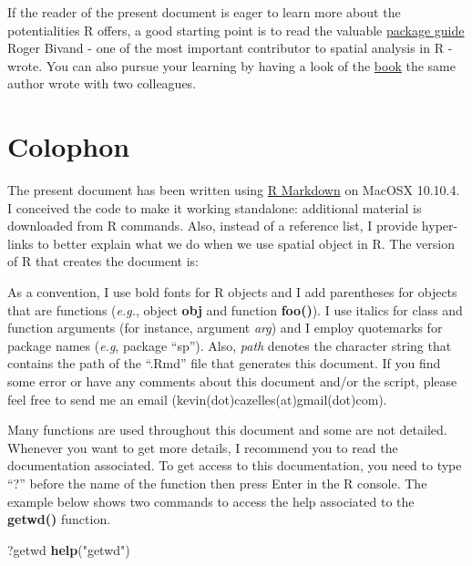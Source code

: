 \documentclass[]{report}
\newenvironment{Shaded}{\begin{snugshade}}{\end{snugshade}}
\newcommand{\KeywordTok}[1]{\textcolor[rgb]{0.13,0.29,0.53}{\textbf{#1}}}
\newcommand{\NormalTok}[1]{#1}
\newcommand{\StringTok}[1]{\textcolor[rgb]{0.31,0.60,0.02}{#1}}
\begin{document}
If the reader of the present document is eager to learn more about the
potentialities R offers, a good starting point is to read the valuable
\href{http://cran.r-project.org/web/views/Spatial.html}{package guide}
Roger Bivand - one of the most important contributor to spatial analysis
in R - wrote. You can also pursue your learning by having a look of the
\href{http://link.springer.com/book/10.1007/978-1-4614-7618-4}{book} the
same author wrote with two colleagues.

\hypertarget{colophon}{%
\section{Colophon}\label{colophon}}

The present document has been written using
\href{http://rmarkdown.rstudio.com/authoring_rcodechunks.html}{R
Markdown} on MacOSX 10.10.4. I conceived the code to make it working
standalone: additional material is downloaded from R commands. Also,
instead of a reference list, I provide hyper-links to better explain
what we do when we use spatial object in R. The version of R that
creates the document is:

As a convention, I use bold fonts for R objects and I add parentheses
for objects that are functions (\emph{e.g.}, object \textbf{obj} and
function \textbf{foo()}). I use italics for class and function arguments
(for instance, argument \emph{arg}) and I employ quotemarks for package
names (\emph{e.g}, package ``sp''). Also, \emph{path} denotes the
character string that contains the path of the ``.Rmd'' file that
generates this document. If you find some error or have any comments
about this document and/or the script, please feel free to send me an
email (kevin(dot)cazelles(at)gmail(dot)com).

Many functions are used throughout this document and some are not
detailed. Whenever you want to get more details, I recommend you to read
the documentation associated. To get access to this documentation, you
need to type ``?'' before the name of the function then press Enter in
the R console. The example below shows two commands to access the help
associated to the \textbf{getwd()} function.

\begin{Shaded}
\begin{Highlighting}[]
\NormalTok{?getwd}
\KeywordTok{help}\NormalTok{(}\StringTok{"getwd"}\NormalTok{)}
\end{Highlighting}
\end{Shaded}
\end{document}
